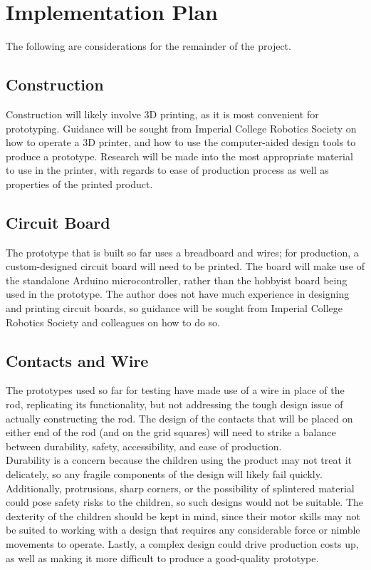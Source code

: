 \chapter{Implementation Plan}
The following are considerations for the remainder of the project.

\section{Construction}
Construction will likely involve 3D printing, as it is most convenient for prototyping. Guidance will be sought from Imperial College Robotics Society on how to operate a 3D printer, and how to use the computer-aided design tools to produce a prototype. Research will be made into the most appropriate material to use in the printer, with regards to ease of production process as well as properties of the printed product.



\section{Circuit Board}
The prototype that is built so far uses a breadboard and wires; for production, a custom-designed circuit board will need to be printed. The board will make use of the standalone Arduino microcontroller, rather than the hobbyist board being used in the prototype. The author does not have much experience in designing and printing circuit boards, so guidance will be sought from Imperial College Robotics Society and colleagues on how to do so. 


\section{Contacts and Wire}
The prototypes used so far for testing have made use of a wire in place of the rod, replicating its functionality, but not addressing the tough design issue of actually constructing the rod. The design of the contacts that will be placed on either end of the rod (and on the grid squares) will need to strike a balance between durability, safety, accessibility, and ease of production. \\

Durability is a concern because the children using the product may not treat it delicately, so any fragile components of the design will likely fail quickly. Additionally, protrusions, sharp corners, or the possibility of splintered material could pose safety risks to the children, so such designs would not be suitable. The dexterity of the children should be kept in mind, since their motor skills may not be suited to working with a design that requires any considerable force or nimble movements to operate. Lastly, a complex design could drive production costs up, as well as making it more difficult to produce a good-quality prototype.\\

